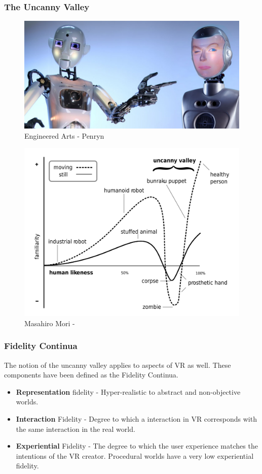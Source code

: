 \begin{frame}
	\frametitle{The Uncanny Valley}
	\begin{figure}
		 \includegraphics[scale=.3]{assets/bots}  
		 \caption{Engineered Arts - Penryn}
	\end{figure}
\end{frame}

\begin{frame}
	\begin{figure}
		 \includegraphics[scale=.13]{assets/uncanny}  
		  \caption{Masahiro Mori - }
	\end{figure}
\end{frame}

\begin{frame}
	\frametitle{Fidelity Continua}
	The notion of the uncanny valley applies to aspects of VR as well. These components have been defined as the Fidelity Continua. 
	
	\begin{itemize}
	 	\item	\textbf{Representation} fidelity - Hyper-realistic to abstract and non-objective worlds. 
		\item	\textbf{Interaction} Fidelity - Degree to which a interaction in VR corresponds with the same interaction in the real world.
		\item \textbf{Experiential} Fidelity - The degree to which the user experience matches the intentions of the VR creator. Procedural worlds have a very low experiential fidelity.
	 \end{itemize}
		
\end{frame}


